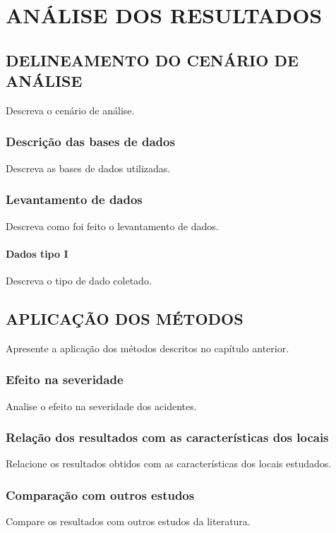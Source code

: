 \chapter{ANÁLISE DOS RESULTADOS} \label{capitulo3}

\section{DELINEAMENTO DO CENÁRIO DE ANÁLISE}

Descreva o cenário de análise.

\subsection{Descrição das bases de dados}

Descreva as bases de dados utilizadas.

\subsection{Levantamento de dados}

Descreva como foi feito o levantamento de dados.

\subsubsection{Dados tipo I}

Descreva o tipo de dado coletado.

\section{APLICAÇÃO DOS MÉTODOS}

Apresente a aplicação dos métodos descritos no capítulo anterior.

\subsection{Efeito na severidade}

Analise o efeito na severidade dos acidentes.

\subsection{Relação dos resultados com as características dos locais}

Relacione os resultados obtidos com as características dos locais estudados.

\subsection{Comparação com outros estudos}

Compare os resultados com outros estudos da literatura.
